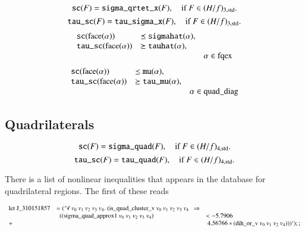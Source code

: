 %
\begin{equation}
    {\operatorname{{\texttt{sc}}}}(F) = {\operatorname{{\texttt{sigma\_qrtet\_x}}}}(F),\quad\text{if } F\in
    (H/f)_{3,{\operatorname{std}}}.
\end{equation}
%
\begin{equation}
        {\operatorname{{\texttt{tau\_sc}}}}(F) =
        {\operatorname{{\texttt{tau\_sigma\_x}}}}(F),\quad\text{if } F\in
        (H/f)_{3,{\operatorname{std}}}.
\end{equation}
%
\begin{equation}
    \begin{array}{lll}
    {\operatorname{{\texttt{sc}}}}({\operatorname{face}}(\alpha)) &\preceq {\operatorname{{\texttt{sigmahat}}}}(\alpha),\\
    {\operatorname{{\texttt{tau\_sc}}}}({\operatorname{face}}(\alpha)) &\succeq {\operatorname{{\texttt{tauhat}}}}(\alpha),\\
    &&\alpha\in {\operatorname{fqex}}
    \end{array}
\end{equation}
%
\begin{equation}
    \begin{array}{lll}
    {\operatorname{{\texttt{sc}}}}({\operatorname{face}}(\alpha)) &\preceq {\operatorname{{\texttt{mu}}}}(\alpha),\\
    {\operatorname{{\texttt{tau\_sc}}}}({\operatorname{face}}(\alpha)) &\succeq {\operatorname{{\texttt{tau\_mu}}}}(\alpha),\\
    &&\alpha\in {\operatorname{quad\_diag}}
    \end{array}
\end{equation}






\subsection{Quadrilaterals}

\begin{equation}
 {\operatorname{{\texttt{sc}}}}(F) = {\operatorname{{\texttt{sigma\_quad}}}}(F),\quad\text{if } F\in
    (H/f)_{4,{\operatorname{std}}}.
\end{equation}
%
\begin{equation}
 {\operatorname{{\texttt{tau\_sc}}}}(F) = {\operatorname{{\texttt{tau\_quad}}}}(F),\quad\text{if } F\in
    (H/f)_{4,{\operatorname{std}}}.
\end{equation}
%

There is a list of nonlinear inequalities that appears in the
database for quadrilateral regions.  The first of these reads



\begin{equation}
\label{eqn:exdih}
\begin{array}{lll} \op{let}\ \op{J\_310151857} &= (`\forall\ v_0\ v_1\ v_2\ v_3\ v_4.\
  (\op{is\_quad\_cluster\_v}\ v_0\ v_1\ v_2\ v_3\ v_4\ \ \Rightarrow\\
        &\ \ ((\op{sigma\_quad\_approx1}\ v_0\ v_1\ v_2\ v_3\ v_4) &<
        -5.7906\\
                + &&\ 4.56766*(\op{dih\_or\_v}\ v_0\ v_1\ v_2\ v_4)))`);;
\end{array}
\end{equation}


